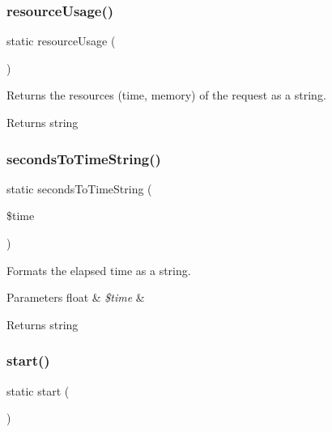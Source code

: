 \subsubsection{\texorpdfstring{resource\+Usage()}{resourceUsage()}}
{\footnotesize\ttfamily static resource\+Usage (\begin{DoxyParamCaption}{ }\end{DoxyParamCaption})\hspace{0.3cm}{\ttfamily [static]}}

Returns the resources (time, memory) of the request as a string.

\begin{DoxyReturn}{Returns}
string 
\end{DoxyReturn}
\mbox{\label{class_p_h_p___timer_a953a729d77565c65fae1c2db93bd7566}} 
\subsubsection{\texorpdfstring{seconds\+To\+Time\+String()}{secondsToTimeString()}}
{\footnotesize\ttfamily static seconds\+To\+Time\+String (\begin{DoxyParamCaption}\item[{}]{\$time }\end{DoxyParamCaption})\hspace{0.3cm}{\ttfamily [static]}}

Formats the elapsed time as a string.


\begin{DoxyParams}[1]{Parameters}
float & {\em \$time} & \\
\hline
\end{DoxyParams}
\begin{DoxyReturn}{Returns}
string 
\end{DoxyReturn}
\mbox{\label{class_p_h_p___timer_a146085d0f3a9d17bdcd7f3d4081d8c0d}} 
\subsubsection{\texorpdfstring{start()}{start()}}
{\footnotesize\ttfamily static start (\begin{DoxyParamCaption}{ }\end{DoxyParamCaption})\hspace{0.3cm}{\ttfamily [static]}}

